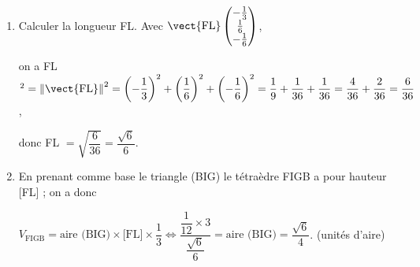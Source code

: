 \begin{enumerate}
\begin{enumerate}
$2(1 + 2t) - (- t) + (1 + t) - 2 = 0 \iff 2 + 4t + t + 1 + t - 2 = 0\iff 6t + 1 = 0\iff t = - \dfrac16$ et en remplaçant dans $x, y$ et $z$, on obtient $x = 1 + \dfrac26 = \dfrac23$,\:$y = -\left(- \dfrac16 \right) = \dfrac16$ et $z = 1 - \dfrac16  = \dfrac56$.

Conclusion avec L $ = d \cap \text{(BIG)},\quad  \text{L}\left(\dfrac23~;~\dfrac16~;~\dfrac56\right)$.
		
		\item Calculer la longueur FL.
Avec $\vect{\text{FL}}\begin{pmatrix} -\frac13\\\frac16\\- \frac16 \end{pmatrix}$, 

on a FL$^2 = \left\|\vect{\text{FL}}\right\|^2 = \left(-\dfrac13\right)^2 + \left(\dfrac16\right)^2  + \left(- \dfrac16 \right)^2  = \dfrac19 + \dfrac{1}{36} + \dfrac{1}{36} =  \dfrac{4}{36} + \dfrac{2}{36} = \dfrac{6}{36}$,

donc FL $ = \sqrt{\dfrac{6}{36}} = \dfrac{\sqrt{6}}{6}$.
		\item %
En prenant comme base le triangle (BIG) le tétraèdre FIGB a pour hauteur [FL] ; on a donc 
		
$V_{\text{FIGB}} = \text{aire (BIG)} \times \text{[FL]} \times \dfrac13 \iff \dfrac{\dfrac{1}{12} \times 3}{\dfrac{\sqrt{6}}{6}} = \text{aire (BIG)} = \dfrac{\sqrt{6}}{4}$. (unités d'aire)
	\end{enumerate}
\end{enumerate}

\medskip

